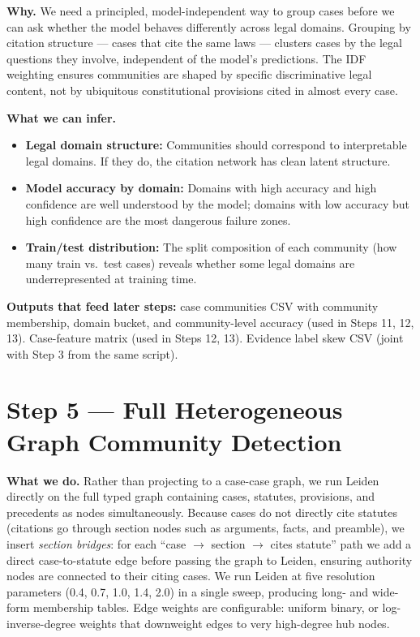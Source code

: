 \documentclass[11pt,a4paper]{article}
\begin{document}
\textbf{Why.}
We need a principled, model-independent way to group cases before we can ask whether
the model behaves differently across legal domains. Grouping by citation structure
--- cases that cite the same laws --- clusters cases by the legal questions they
involve, independent of the model's predictions. The IDF weighting ensures
communities are shaped by specific discriminative legal content, not by ubiquitous
constitutional provisions cited in almost every case.

\textbf{What we can infer.}
\begin{itemize}
  \item \textbf{Legal domain structure:} Communities should correspond to
    interpretable legal domains. If they do, the citation network has clean latent
    structure.
  \item \textbf{Model accuracy by domain:} Domains with high accuracy and high
    confidence are well understood by the model; domains with low accuracy but high
    confidence are the most dangerous failure zones.
  \item \textbf{Train/test distribution:} The split composition of each community
    (how many train vs.\ test cases) reveals whether some legal domains are
    underrepresented at training time.
\end{itemize}

\textbf{Outputs that feed later steps:} case communities CSV with community
membership, domain bucket, and community-level accuracy (used in Steps 11, 12, 13).
Case-feature matrix (used in Steps 12, 13). Evidence label skew CSV (joint with
Step 3 from the same script).

\bigskip

\section{Step 5 \texorpdfstring{\textcolor{stepgray}{---}}{---} Full Heterogeneous Graph Community Detection}

\textbf{What we do.}
Rather than projecting to a case-case graph, we run Leiden directly on the full typed
graph containing cases, statutes, provisions, and precedents as nodes simultaneously.
Because cases do not directly cite statutes (citations go through section nodes such
as arguments, facts, and preamble), we insert \emph{section bridges}: for each
``case $\to$ section $\to$ cites statute'' path we add a direct case-to-statute edge
before passing the graph to Leiden, ensuring authority nodes are connected to their
citing cases. We run Leiden at five resolution parameters (0.4, 0.7, 1.0, 1.4, 2.0)
in a single sweep, producing long- and wide-form membership tables. Edge weights are
configurable: uniform binary, or log-inverse-degree weights that downweight edges to
very high-degree hub nodes.
\end{document}
